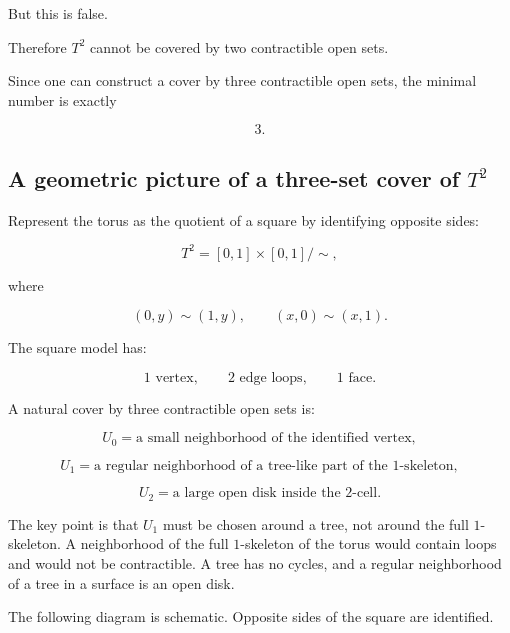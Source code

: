 \documentclass[12pt,a4paper]{article}
\theoremstyle{notespace}
\begin{document}
But this is false.

Therefore \(T^2\) cannot be covered by two contractible open sets.

Since one can construct a cover by three contractible open sets, the minimal number is exactly

\[
\boxed{3}.
\]

\subsection{A geometric picture of a three-set cover of \(T^2\)}

Represent the torus as the quotient of a square by identifying opposite sides:

\[
T^2=[0,1]\times[0,1]/\sim,
\]

where

\[
(0,y)\sim(1,y),
\qquad
(x,0)\sim(x,1).
\]

The square model has:

\[
1\text{ vertex},
\qquad
2\text{ edge loops},
\qquad
1\text{ face}.
\]

A natural cover by three contractible open sets is:

\[
U_0=\text{a small neighborhood of the identified vertex},
\]

\[
U_1=\text{a regular neighborhood of a tree-like part of the }1\text{-skeleton},
\]

\[
U_2=\text{a large open disk inside the }2\text{-cell}.
\]

The key point is that \(U_1\) must be chosen around a tree, not around the full \(1\)-skeleton. A neighborhood of the full \(1\)-skeleton of the torus would contain loops and would not be contractible. A tree has no cycles, and a regular neighborhood of a tree in a surface is an open disk.

The following diagram is schematic. Opposite sides of the square are identified.
\end{document}
